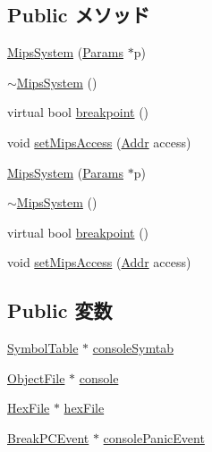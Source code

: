 \subsection*{Public メソッド}
\begin{DoxyCompactItemize}
\item 
\hyperlink{classMipsSystem_a62dbd286dd7ffc15d71da3c22bfafe7a}{MipsSystem} (\hyperlink{classMipsSystem_acf01be080284e8262bc1ff41fbd1710c}{Params} $\ast$p)
\item 
\hyperlink{classMipsSystem_a325a17b3fbc7b08bfa6b90e3e2be0253}{$\sim$MipsSystem} ()
\item 
virtual bool \hyperlink{classMipsSystem_ae59ed2201db88c0668ca26040f6a3ad0}{breakpoint} ()
\item 
void \hyperlink{classMipsSystem_a22b402a730d5f7c377a16e7ce2754e7f}{setMipsAccess} (\hyperlink{base_2types_8hh_af1bb03d6a4ee096394a6749f0a169232}{Addr} access)
\item 
\hyperlink{classMipsSystem_a62dbd286dd7ffc15d71da3c22bfafe7a}{MipsSystem} (\hyperlink{classMipsSystem_acf01be080284e8262bc1ff41fbd1710c}{Params} $\ast$p)
\item 
\hyperlink{classMipsSystem_a325a17b3fbc7b08bfa6b90e3e2be0253}{$\sim$MipsSystem} ()
\item 
virtual bool \hyperlink{classMipsSystem_aa9fdfc3926a9047bc0fb3d7b13030064}{breakpoint} ()
\item 
void \hyperlink{classMipsSystem_a22b402a730d5f7c377a16e7ce2754e7f}{setMipsAccess} (\hyperlink{base_2types_8hh_af1bb03d6a4ee096394a6749f0a169232}{Addr} access)
\end{DoxyCompactItemize}
\subsection*{Public 変数}
\begin{DoxyCompactItemize}
\item 
\hyperlink{classSymbolTable}{SymbolTable} $\ast$ \hyperlink{classMipsSystem_a112883d2eb9b5a5c79f3717e73a15dbb}{consoleSymtab}
\item 
\hyperlink{classObjectFile}{ObjectFile} $\ast$ \hyperlink{classMipsSystem_ac1fd76adeba49aea2ab70e0cba58d9d0}{console}
\item 
\hyperlink{classHexFile}{HexFile} $\ast$ \hyperlink{classMipsSystem_a09784a3946cc01ec7abea0b520953c5c}{hexFile}
\item 
\hyperlink{classBreakPCEvent}{BreakPCEvent} $\ast$ \hyperlink{classMipsSystem_a0266101e4c5bb3cef386e47221ba7f83}{consolePanicEvent}
\end{DoxyCompactItemize}
